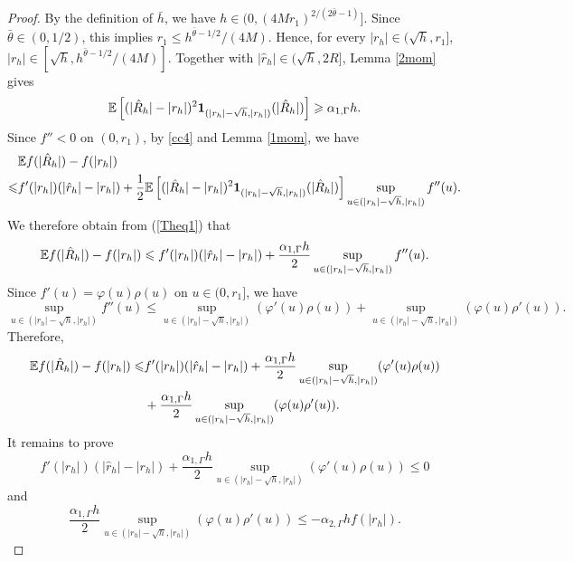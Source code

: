 \documentclass[aap]{imsart}
\theoremstyle{plain}
\theoremstyle{definition}
\begin{document}
\begin{proof}
By the definition of $\bar h$, we have $h \in (0, (4Mr_1)^{2/(2\bar{\theta}-1)}]$. Since $\bar\theta\in(0,1/2)$, this implies $r_1\leqslant h^{\bar{\theta}-1/2}/(4M)$. Hence, for every $|r_h|\in(\sqrt h,r_1]$, \(|r_h|\in[\sqrt h,h^{\bar\theta-1/2}/(4M)]\). Together with $|\hat{r}_h|\in(\sqrt h,2R]$, Lemma \ref{2mom} gives
\begin{equation}\label{Theq1}
\mathbb{E}\left[(|\hat{R}_h|-|r_h|)^2{\bf 1}_{(|r_h|-\sqrt{h}, |r_h|)}(|\hat{R}_h|)\right]\geqslant \alpha_{1, \Gamma}h.
\end{equation}
Since $f''< 0$ on $(0, r_1)$, by \eqref{cc4} and Lemma \ref{1mom}, we have
\begin{align*}
&\mathbb{E} f(|\hat{R}_h|)-f(|r_h|)\\
\leqslant &f'(|r_h|)(|\hat{r}_h|-|r_h|)+\frac{1}{2}\mathbb{E}\left[(|\hat{R}_h|-|r_h|)^2{\bf 1}_{(|r_h|-\sqrt{h}, |r_h|)}(|\hat{R}_h|)\right]\sup_{u\in(|r_h|-\sqrt{h}, |r_h|)}f''(u).
\end{align*}
We therefore obtain from (\ref{Theq1}) that
\begin{equation*}
\mathbb{E} f(|\hat{R}_h|)-f(|r_h|)\leqslant f'(|r_h|)(|\hat{r}_h|-|r_h|) + \frac{\alpha_{1, \Gamma} h}{2}\sup_{u\in(|r_h|-\sqrt{h}, |r_h|)}f''(u).
\end{equation*}
Since $f'(u) = \varphi(u)\rho(u)$ on $u\in (0, r_1]$, we have
$$\sup_{u\in(|r_h|-\sqrt{h}, |r_h|)}f''(u)\leqslant \sup_{u\in(|r_h|-\sqrt{h}, |r_h|)}(\varphi'(u)\rho(u))+\sup_{u\in(|r_h|-\sqrt{h}, |r_h|)}(\varphi(u)\rho'(u)).$$
Therefore, 
\begin{align*}
\mathbb{E} f(|\hat{R}_h|)-f(|r_h|)\leqslant& f'(|r_h|)(|\hat{r}_h|-|r_h|) + \frac{\alpha_{1, \Gamma} h}{2} \sup_{u\in(|r_h|-\sqrt{h}, |r_h|)}(\varphi'(u)\rho(u))\\
&+\frac{\alpha_{1, \Gamma} h}{2}\sup_{u\in(|r_h|-\sqrt{h}, |r_h|)}(\varphi(u)\rho'(u)).
\end{align*}
It remains to prove
\begin{equation}\label{Ca1}
f'(|r_h|)(|\hat{r}_h|-|r_h|)+\frac{\alpha_{1, \Gamma} h}{2} \sup_{u\in(|r_h|-\sqrt{h}, |r_h|)}(\varphi'(u)\rho(u))\leqslant 0
\end{equation}
and 
\begin{equation}\label{Ca2}
\frac{\alpha_{1, \Gamma}h}{2}\sup_{u\in(|r_h|-\sqrt{h}, |r_h|)}(\varphi(u)\rho'(u))\leqslant -\alpha_{2, \Gamma}h f(|r_h|).
\end{equation}
				

\end{proof}
\end{document}
